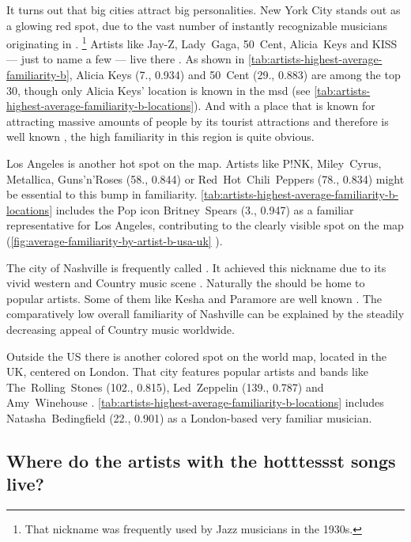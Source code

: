 \documentclass[                                                             %
        12pt,                                                                   %
        twoside                                                                 %
    ]{scrartcl}                                                                 %
\begin{document}
It turns out that big cities attract big personalities. 
New York City stands out as a glowing red spot, 
due to the vast number of instantly recognizable musicians 
originating in .%
\footnote{That nickname was frequently used by Jazz musicians in the 1930s.}
Artists like Jay-Z, Lady~Gaga, 50~Cent, Alicia~Keys 
and KISS --- just to name a few --- live there \parencite{ranker2018ny}.
As shown in \autoref{tab:artists-highest-average-familiarity-b}, 
Alicia Keys (7., 0.934) and 50~Cent (29., 0.883) are among the top 30, 
though only Alicia Keys' location is known in the \gls{msd}
(see \autoref{tab:artists-highest-average-familiarity-b-locations}).
And with a place that is known for attracting 
massive amounts of people by its tourist attractions 
and therefore is well known 
\parencite{nyc2018mayor}, 
the high familiarity in this region is quite obvious.

Los Angeles is another hot spot on the map. 
Artists like P!NK, Miley~Cyrus, Metallica, 
Guns'n'Roses (58., 0.844) or Red~Hot~Chili~Peppers (78., 0.834)
\parencite{ranker2018la}
might be essential to this bump in familiarity.
\autoref{tab:artists-highest-average-familiarity-b-locations} includes 
the Pop icon Britney~Spears (3., 0.947) as a familiar representative for Los Angeles, 
contributing to the clearly visible spot on the map 
(\autoref{fig:average-familiarity-by-artist-b-usa-uk}%
).

The city of Nashville is frequently called .
It achieved this nickname due to its vivid western 
and Country music scene \parencite{harper2013nashville}.
Naturally the  should be home to popular artists.
Some of them like Kesha and Paramore are 
well known \parencite{ranker2018nashville}.
The comparatively low overall familiarity 
of Nashville can be explained 
by the steadily decreasing appeal of Country music worldwide.

Outside the US there is another colored spot on the world map, 
located in the UK, centered on London. 
That city features popular artists and bands 
like The~Rolling~Stones (102., 0.815), Led~Zeppelin (139., 0.787) 
and Amy~Winehouse \parencite{ranker2018london}.
\autoref{tab:artists-highest-average-familiarity-b-locations} includes 
Natasha~Bedingfield (22., 0.901) as a London-based very familiar musician.

\subsection{Where do the artists with the hotttessst songs live?}
\end{document}
